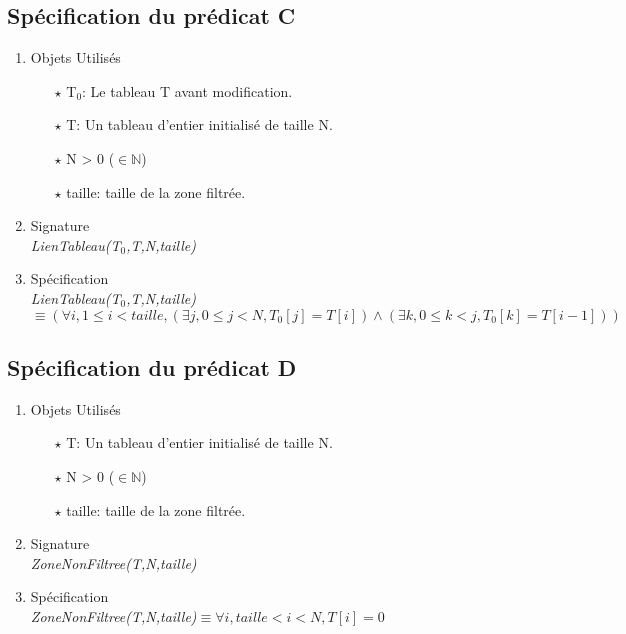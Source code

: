 \documentclass[a4paper, 11pt, oneside]{article}
\begin{document}
    \subsection{Spécification du prédicat C}

    \begin{enumerate}
        \item Objets Utilisés
            \begin{itemize}
                \item[$\star$] T$_0$: Le tableau T avant modification.
                \item[$\star$] T: Un tableau d'entier initialisé de taille N.
                \item[$\star$] N > 0 ($\in \mathbb{N}$)
                \item[$\star$] taille: taille de la zone filtrée. 
            \end{itemize}

        \item Signature \\
            \textit{LienTableau(T$_0$,T,N,taille)}

        \item Spécification\\
            \textit{LienTableau(T$_0$,T,N,taille)}$\equiv (\forall i, 1\leq i < taille, (\exists j, 0\leq j < N, T_0[j] = T[i]) \wedge (\exists k, 0\leq k < j, T_0[k] = T[i-1]) )$
    \end{enumerate}

    \subsection{Spécification du prédicat D}

    \begin{enumerate}
        \item Objets Utilisés
            \begin{itemize}
                \item[$\star$] T: Un tableau d'entier initialisé de taille N.
                \item[$\star$] N > 0 ($\in \mathbb{N}$)
                \item[$\star$] taille: taille de la zone filtrée. 
            \end{itemize}

        \item Signature \\
            \textit{ZoneNonFiltree(T,N,taille)}

        \item Spécification\\
            \textit{ZoneNonFiltree(T,N,taille)}$\equiv \forall i, taille < i < N, T[i]=0$
    \end{enumerate}
\end{document}
